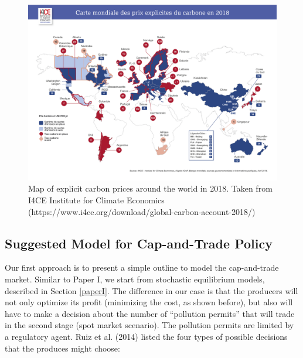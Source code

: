 \documentclass[11pt, letterpaper]{article}
\begin{document}
\begin{figure}[ht!]
 \includegraphics[width=\textwidth]{Carte-prix-du-carbone.png}
 
 \caption{Map of explicit carbon prices around the world in 2018. Taken from I4CE Institute for Climate Economics (https://www.i4ce.org/download/global-carbon-account-2018/)}
 \label{map-carbon-price}
\end{figure}

\subsection{Suggested Model for Cap-and-Trade Policy}
Our first approach is to present a simple outline to model the cap-and-trade market. Similar to Paper I, we start from stochastic equilibrium models, described in Section \ref{paperI}. The difference in our case is that the producers will not only optimize its profit (minimizing the cost, as shown before), but also will have to make a decision about the number of ``pollution permits'' that will trade in the second stage (spot market scenario). The pollution permits are limited by a regulatory agent. Ruiz et al. (2014) listed the four types of possible decisions that the produces might choose:
\end{document}
